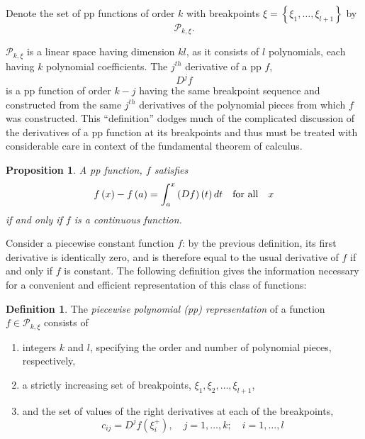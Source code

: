 \documentclass[12pt]{article}
\newcommand{\PP}{\mathcal{P}}
\newtheorem{proposition}[theorem]{Proposition}
\theoremstyle{definition}
\newtheorem{definition}{Definition}[section]
\begin{document}
Denote the set of pp functions of order $k$ with breakpoints $\xi=\left\{\xi_1,\dots,\xi_{l+1}\right\}$ by 
\[
\mathcal{P}_{k,\xi}.
\]

$\mathcal{P}_{k,\xi}$ is a linear space having dimension $kl$, as it consists of $l$ polynomials, each having $k$ polynomial coefficients. The $j^{th}$ derivative of a pp $f$,
\[
D^jf
\]
\noindent
is a pp function of order $k-j$ having the same breakpoint sequence and constructed from the same $j^{th}$ derivatives of the polynomial pieces from which $f$ was constructed. This ``definition'' dodges much of the complicated discussion of the derivatives of a pp function at its breakpoints and thus must be treated with considerable care in context of the fundamental theorem of calculus.

\begin{proposition} \label{proposition:continuous_function}
A pp function, $f$ satisfies
\[
f\left(x\right) - f\left(a\right) = \int_a^x \left(Df\right)\left(t\right)dt\quad \textup{for all} \quad x
\]
if and only if $f$ is a continuous function.
\end{proposition}

Consider a piecewise constant function $f$: by the previous definition, its first derivative is identically zero, and is therefore equal to the usual derivative of $f$ if and only if $f$ is constant. The following definition gives the information necessary for a convenient and efficient representation of this class of functions:

\begin{definition}\label{definition:pp_representation}
The \emph{piecewise polynomial (pp) representation} of a function $f \in \PP_{k,\xi}$ consists of 
\begin{enumerate}
\item integers $k$ and $l$, specifying the order and number of polynomial pieces, respectively,
\item a strictly increasing set of breakpoints, $\xi_1,\xi_2,\dots, \xi_{l+1}$,
\item and the set of values of the right derivatives at each of the breakpoints, 
\[
c_{ij} = D^{j}f\left(\xi_i^+\right), \quad j=1,\dots,k;\quad i=1,\dots,l 
\]
\end{enumerate}
\end{definition} 
 
\end{document}
